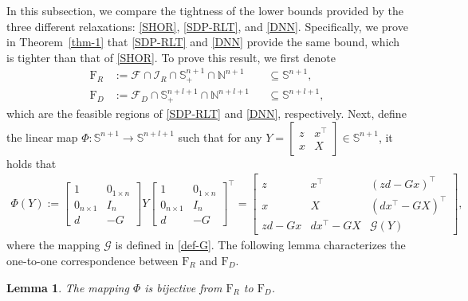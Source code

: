 \documentclass[11pt]{article}
\theoremstyle{plain}
\newtheorem{lemma}{Lemma}
\def\F{\mathcal{F}}
\def\I{\mathcal{I}}
\def\G{\mathcal{G}}
\def\S{\mathbb{S}}
\begin{document}
In this subsection, we compare the tightness of the lower bounds provided by the three different relaxations: \eqref{SHOR}, \eqref{SDP-RLT}, and \eqref{DNN}. Specifically, we prove in Theorem~\ref{thm-1} that \eqref{SDP-RLT} and \eqref{DNN} provide the same bound, which is tighter than that of \eqref{SHOR}. To prove this result, we first denote
%
\begin{equation*}
\begin{aligned}
{\mathrm{F}_R}&:=\F\cap\I_R\cap \mathbb{S}_{+}^{n+1} \cap\mathbb{N}^{n+1}&&\subseteq\S^{n+1},\\
{\mathrm{F}_D}&:=\F_D\cap \mathbb{S}_{+}^{n+l+1} \cap\mathbb{N}^{n+l+1}&&\subseteq\S^{n+l+1},
\end{aligned}
\end{equation*}
%
which are the feasible regions of \eqref{SDP-RLT} and \eqref{DNN}, respectively. Next, define the linear map $\Phi:\S^{n+1}\rightarrow\S^{n+l+1}$ such that for any $Y=\begin{bmatrix}z& x^\top \\ x & X\end{bmatrix}\in\S^{n+1}$, it holds that
     {\small
     \begin{equation}
     \label{phi}
     \begin{aligned}
     \Phi\left(Y\right):=\begin{bmatrix}
             1&0_{1\times n}\\
             0_{n\times 1}&I_n\\
             d&-G
         \end{bmatrix}Y\begin{bmatrix}
             1&0_{1\times n}\\
             0_{n\times 1}&I_n\\
             d&-G
         \end{bmatrix}^\top
         =\begin{bmatrix}
             z&x^\top&(zd-Gx)^\top\\
             x&X&(dx^\top-GX)^\top\\
             zd-Gx&dx^\top-GX&\G(Y)
         \end{bmatrix},
     \end{aligned}
     \end{equation}
     }\normalsize
where the mapping $\G$ is defined in \eqref{def-G}.
The following lemma characterizes the one-to-one correspondence between ${\mathrm{F}_R}$ and ${\mathrm{F}_D}$.
\begin{lemma}\label{lemma-F1-F2}
The mapping $\Phi$ is bijective from ${\mathrm{F}_R}$ to ${\mathrm{F}_D}$.
\end{lemma}
\end{document}
